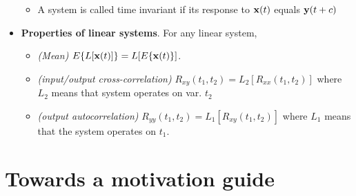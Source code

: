\documentclass[a4paper, oneside]{book}
\begin{document}
\begin{itemize}
\begin{itemize}
	\item A system is called time invariant if its response to $\mathbf x(t)$ equals $\mathbf y(t+c)$
	\end{itemize}
\item \textbf{Properties of linear systems}. For any linear system, 
	\begin{itemize}
	\item \textit{(Mean)} $E\{L[\mathbf x(t)]\}=L[E\{\mathbf x(t)\}]$.
	\item \textit{(input/output cross-correlation)} $R_{xy}(t_1,t_2) = L_2[R_{xx}(t_1,t_2)]$ where $L_2$ means that system operates on var. $t_2$
	\item \textit{(output autocorrelation)} $R_{yy}(t_1,t_2)=L_1[R_{xy}(t_1,t_2)]$ where $L_1$ means that the system operates on $t_1$.
	\end{itemize}
\end{itemize}














\chapter*{Towards a motivation guide}
\end{document}
